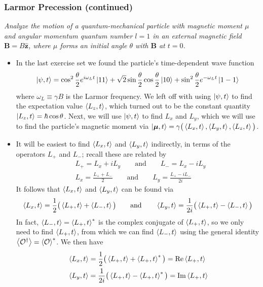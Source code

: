 \documentclass[11pt, a4paper]{article}
\newcommand{\eqtext}[1]{\qquad \text{#1} \qquad}
\renewcommand{\vec}[1]{\bm{#1}} %
\newcommand{\uvec}[1]{\hat{\vec{#1}}} %
\newcommand{\m}{\vec{\mu}}  %
\begin{document}
\subsubsection{Larmor Precession (continued)}
\textit{Analyze the motion of a quantum-mechanical particle with magnetic moment $ \mu $ and angular momentum quantum number $ l = 1 $ in an external magnetic field $ \vec{B} = B\uvec{z} $, where $ \mu $ forms an initial angle $ \theta $ with $ \vec{B} $ at $ t = 0 $.}
\begin{itemize}
	\item In the last exercise set we found the particle's time-dependent wave function
	\begin{equation*}
		\ket{\psi, t} =\cos^{2} \frac{\theta}{2} e^{i \omega_{L} t}\ket{11} + \sqrt{2}\sin \frac{\theta}{2} \cos \frac{\theta}{2} \ket{10} + \sin^{2}\frac{\theta}{2} e^{-\omega_{L} t}\ket{1 -1}
	\end{equation*}
	where $ \omega_{L} \equiv \gamma B $ is the Larmor frequency. We left off with using $ \ket{\psi, t} $ to find the expectation value $ \ev{L_{z}, t} $, which turned out to be the constant quantity $ \ket{L_{z}, t} = \hbar \cos \theta $. Next, we will use $ \ket{\psi, t} $ to find $ L_{x} $ and $ L_{y} $, which we will use to find the particle's magnetic moment via $ \ket{\m, t} = \gamma \big(\ev{L_{x}, t}, \ev{L_{y}, t}, \ev{L_{z}, t}\big) $.
	
	\item It will be easiest to find $ \ev{L_{x}, t} $ and $ \ev{L_{y}, t} $ indirectly, in terms of the operators $ L_{+} $ and $ L_{-} $; recall these are related by 
	\begin{align*}
		& L_{+} = L_{x} + iL_{y} \eqtext{and} L_{-} = L_{x} - i L_{y}\\
		& L_{x} = \frac{L_{+}+L_{-}}{2} \eqtext{and} L_{y} = \frac{L_{+} - iL_{-}}{2i}
	\end{align*}
	It  follows that  $ \ev{L_{x}, t} $ and $ \ev{L_{y}, t} $ can be found via
	\begin{equation*}
		\ev{L_{x}, t} = \frac{1}{2}\big(\ev{L_{+}, t} + \ev{L_{-}, t} \big) \eqtext{and} \ev{L_{y}, t} = \frac{1}{2i}\big(\ev{L_{+}, t} - \ev{L_{-}, t} \big)
	\end{equation*}
	In fact, $ \ev{L_{-}, t} = \ev{L_{+}, t}^{*} $ is the complex conjugate of  $ \ev{L_{+}, t} $, so we only need to find $ \ev{L_{+}, t} $, from which we can find $ \ev{L_{-}, t} $ using the general identity $ \ev{\mathcal{O}^{\dagger}} = \ev{\mathcal{O}}^{*} $. We then have
	\begin{align*}
		& \ev{L_{x}, t} = \frac{1}{2}\big(\ev{L_{+}, t} + \ev{L_{+}, t}^{*} \big) = \Re \ev{L_{+}, t}\\
		& \ev{L_{y}, t} = \frac{1}{2i}\big(\ev{L_{+}, t} - \ev{L_{+}, t}^{*} \big) = \Im \ev{L_{+}, t}
	\end{align*}
	

\end{itemize}
\end{document}
